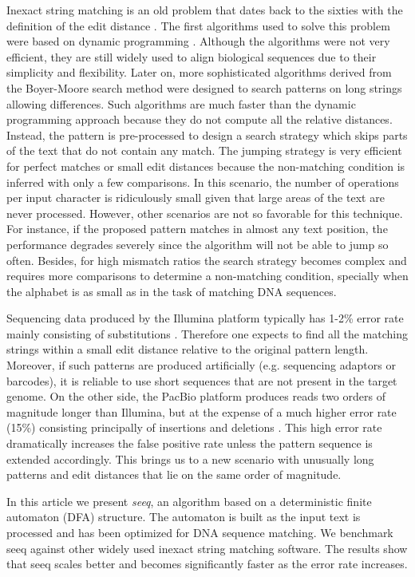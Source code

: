 \documentclass{bioinfo}
\begin{document}
Inexact string matching is an old problem that dates back to the
sixties with the definition of the edit distance \citep{Lev65}. The
first algorithms used to solve this problem were based on dynamic
programming \citep{NW70}. Although the algorithms were not very
efficient, they are still widely used to align biological sequences
due to their simplicity and flexibility. Later on, more sophisticated
algorithms derived from the Boyer-Moore search method \citep{BM77}
were designed to search patterns on long strings allowing
differences. Such algorithms are much faster than the dynamic
programming approach because they do not compute all the relative
distances. Instead, the pattern is pre-processed to design a search
strategy which skips parts of the text that do not contain any
match. The jumping strategy is very efficient for perfect matches or
small edit distances because the non-matching condition is inferred
with only a few comparisons. In this scenario, the number of
operations per input character is ridiculously small given that large
areas of the text are never processed. However, other scenarios are
not so favorable for this technique. For instance, if the proposed
pattern matches in almost any text position, the performance degrades
severely since the algorithm will not be able to jump so
often. Besides, for high mismatch ratios the search strategy becomes
complex and requires more comparisons to determine a non-matching
condition, specially when the alphabet is as small as in the task of
matching DNA sequences.

Sequencing data produced by the Illumina platform \citep{Mar05}
typically has 1-2\% error rate mainly consisting of substitutions
\citep{Doh08}. Therefore one expects to find all the matching strings
within a small edit distance relative to the original pattern
length. Moreover, if such patterns are produced artificially
(e.g. sequencing adaptors or barcodes), it is reliable to use short 
sequences that are not present in the target genome. On the other
side, the PacBio platform produces reads two orders of magnitude
longer than Illumina, but at the expense of a much higher error rate
(15\%) consisting principally of insertions and deletions
\citep{Eid09}. This high error rate dramatically increases the false
positive rate unless the pattern sequence is extended
accordingly. This brings us to a new scenario with unusually long
patterns and edit distances that lie on the same order of magnitude.

In this article we present \emph{seeq}, an algorithm based on a
deterministic finite automaton (DFA) structure. The automaton is built
as the input text is processed and has been optimized for DNA sequence
matching. We benchmark seeq against other widely used inexact string
matching software. The results show that seeq scales better and
becomes significantly faster as the error rate increases.
\end{document}
